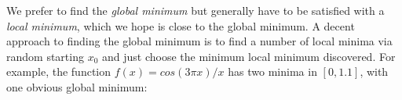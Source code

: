 \documentclass[titlepage]{tufte-book}
\begin{document}
\begin{fullwidth}
We prefer to find the {\em global minimum} but generally have to be satisfied with a {\em local minimum}, which we hope is close to the global minimum. A decent approach to finding the global minimum is to find a number of local minima via random starting $x_0$ and just choose the minimum local minimum discovered. For example, the function $f(x) = cos(3\pi x) / x$ has two minima in $[0,1.1]$, with one obvious global minimum:

\begin{center}
\end{center}


\end{fullwidth}
\end{document}
